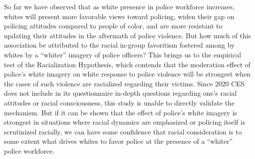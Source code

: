 \documentclass[
  12pt,
]{article}
\begin{document}
So far we have observed that as white presence in police workforce
increases, whites will present more favorable views toward policing,
widen their gap on policing attitudes compared to people of color, and
are more resistant to updating their attitudes in the aftermath of
police violence. But how much of this association be attributed to the
racial in-group favoritism fostered among by whites by a ``whiter''
imagery of police officers? This brings us to the empirical test of the
Racialization Hypothesis, which contends that the moderation effect of
police's white imagery on white response to police violence will be
strongest when the cases of such violence are racialized regarding their
victims. Since 2020 CES does not include in its questionnaire in-depth
questions regarding one's racial attitudes or racial consciousness, this
study is unable to directly validate the mechanism. But if it can be
shown that the effect of police's white imagery is strongest in
situations where racial dynamics are emphasized or policing itself is
scrutinized racially, we can have some confidence that racial
consideration is to some extent what drives whites to favor police at
the presence of a ``whiter'' police workforce.
\end{document}
